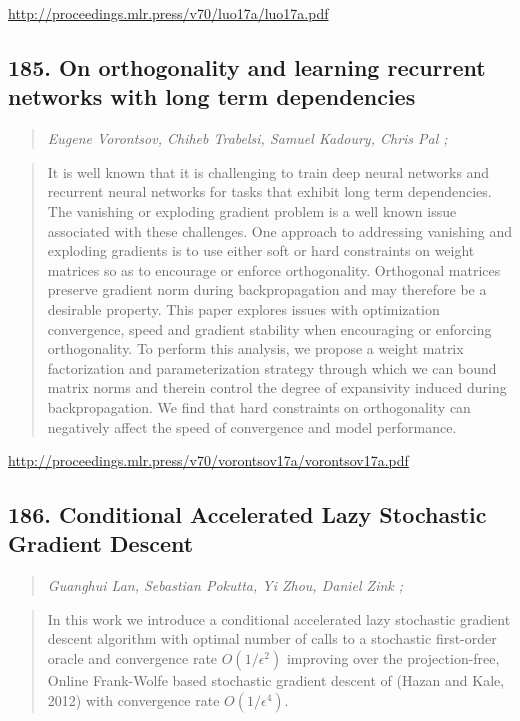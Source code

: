 \documentclass{article}
\begin{document}
\href{http://proceedings.mlr.press/v70/luo17a/luo17a.pdf}{http://proceedings.mlr.press/v70/luo17a/luo17a.pdf}

\subsection{185. On orthogonality and learning recurrent networks with long term dependencies}

\begin{quote}
\footnotesize{\textit{Eugene Vorontsov, Chiheb Trabelsi, Samuel Kadoury, Chris Pal ;}}

\end{quote}

\begin{quote}
    It is well known that it is challenging to train deep neural networks and recurrent neural networks for tasks that exhibit long term dependencies. The vanishing or exploding gradient problem is a well known issue associated with these challenges. One approach to addressing vanishing and exploding gradients is to use either soft or hard constraints on weight matrices so as to encourage or enforce orthogonality. Orthogonal matrices preserve gradient norm during backpropagation and may therefore be a desirable property. This paper explores issues with optimization convergence, speed and gradient stability when encouraging or enforcing orthogonality. To perform this analysis, we propose a weight matrix factorization and parameterization strategy through which we can bound matrix norms and therein control the degree of expansivity induced during backpropagation. We find that hard constraints on orthogonality can negatively affect the speed of convergence and model performance.  
\end{quote}

\href{http://proceedings.mlr.press/v70/vorontsov17a/vorontsov17a.pdf}{http://proceedings.mlr.press/v70/vorontsov17a/vorontsov17a.pdf}

\subsection{186. Conditional Accelerated Lazy Stochastic Gradient Descent}

\begin{quote}
\footnotesize{\textit{Guanghui Lan, Sebastian Pokutta, Yi Zhou, Daniel Zink ;}}

\end{quote}

\begin{quote}
    In this work we introduce a conditional accelerated lazy stochastic gradient descent algorithm with optimal number of calls to a stochastic first-order oracle and convergence rate $O(1/\epsilon^2)$ improving over the projection-free, Online Frank-Wolfe based stochastic gradient descent of (Hazan and Kale, 2012) with convergence rate $O(1/\epsilon^4)$.  
\end{quote}
\end{document}
